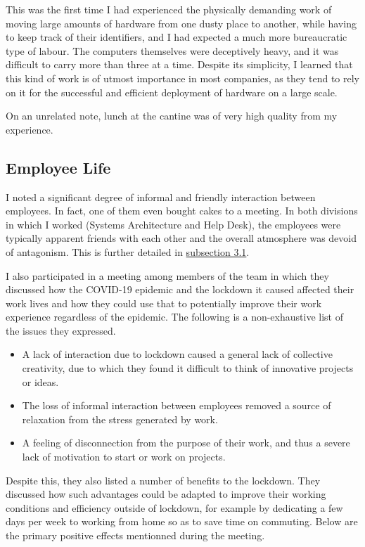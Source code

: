 This was the first time I had experienced the physically demanding work of moving large amounts of hardware from one dusty place to another, while having to keep track of their identifiers, and I had expected a much more bureaucratic type of labour. The computers themselves were deceptively heavy, and it was difficult to carry more than three at a time. Despite its simplicity, I learned that this kind of work is of utmost importance in most companies, as they tend to rely on it for the successful and efficient deployment of hardware on a large scale. 

On an unrelated note, lunch at the cantine was of very high quality from my experience.

\subsection{Employee Life}

I noted a significant degree of informal and friendly interaction between employees. In fact, one of them even bought cakes to a meeting. In both divisions in which I worked (Systems Architecture and Help Desk), the employees were typically apparent friends with each other and the overall atmosphere was devoid of antagonism. This is further detailed in \hyperlink{subsection.3.1}{subsection 3.1}.

I also participated in a meeting among members of the team in which they discussed how the COVID-19 epidemic and the lockdown it caused affected their work lives and how they could use that to potentially improve their work experience regardless of the epidemic. The following is a non-exhaustive list of the issues they expressed.

\begin{itemize}
    \item A lack of interaction due to lockdown caused a general lack of collective creativity, due to which they found it difficult to think of innovative projects or ideas.
    \item The loss of informal interaction between employees removed a source of relaxation from the stress generated by work.
    \item A feeling of disconnection from the purpose of their work, and thus a severe lack of motivation to start or work on projects.
\end{itemize}

Despite this, they also listed a number of benefits to the lockdown. They discussed how such advantages could be adapted to improve their working conditions and efficiency outside of lockdown, for example by dedicating a few days per week to working from home so as to save time on commuting. Below are the primary positive effects mentionned during the meeting.

